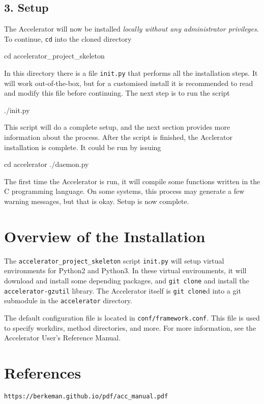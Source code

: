 \documentclass[a4paper]{article}
\begin{document}
\subsection*{3. Setup}
The Accelerator will now be installed \textsl{locally without any
administrator privileges}.  To continue, \texttt{cd} into the cloned
directory
\begin{shell}
cd accelerator_project_skeleton
\end{shell}
In this directory there is a file \texttt{init.py} that performs all
the installation steps.  It will work out-of-the-box, but for a
customised install it is recommended to read and modify this file
before continuing.  The next step is to run the script
\begin{shell}
./init.py
\end{shell}
This script will do a complete setup, and the next section provides
more information about the process.  After the script is finished, the
Acclerator installation is complete.  It could be run by issuing
\begin{shell}
cd accelerator
./daemon.py  
\end{shell}
The first time the Accelerator is run, it will compile some functions
written in the C programming language.  On some systems, this process
may generate a few warning messages, but that is okay.  Setup is now
complete.  \thispagestyle{empty}



\section*{Overview of the Installation}
The \texttt{accelerator\_project\_skeleton} script \texttt{init.py}
will setup virtual environments for Python2 and Python3.  In these
virtual environments, it will download and install some depending
packages, and \texttt{git clone} and install the
\texttt{accelerator-gzutil} library.  The Accelerator itself is
\texttt{git clone}d into a git submodule in the \texttt{accelerator}
directory.

The default configuration file is located in
\texttt{conf/framework.conf}.  This file is used to specify workdirs,
method directories, and more.  For more information, see the
Accelerator User's Reference Manual.



\section*{References}
\texttt{https://berkeman.github.io/pdf/acc\_manual.pdf}
\end{document}

